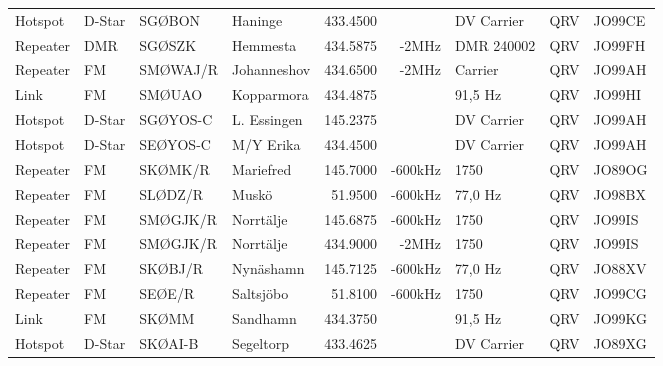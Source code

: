 \documentclass[10pt,swedish,a4paper,twoside]{article}
\begin{document}
\begin{landscape}
\begin{longtable}{llllrrlcl}
	Hotspot           & D-Star       & SGØBON        & Haninge      &          433.4500 &                & DV Carrier      &       QRV       & JO99CE           \\
	Repeater          & DMR          & SGØSZK        & Hemmesta     &          434.5875 &          -2MHz & DMR 240002      &       QRV       & JO99FH           \\
	Repeater          & FM           & SMØWAJ/R      & Johanneshov  &          434.6500 &          -2MHz & Carrier         &       QRV       & JO99AH           \\
	Link              & FM           & SMØUAO        & Kopparmora   &          434.4875 &                & 91,5 Hz         &       QRV       & JO99HI           \\
	Hotspot           & D-Star       & SGØYOS-C      & L. Essingen  &          145.2375 &                & DV Carrier      &       QRV       & JO99AH           \\
	Hotspot           & D-Star       & SEØYOS-C      & M/Y Erika    &          434.4500 &                & DV Carrier      &       QRV       & JO99AH           \\
	Repeater          & FM           & SKØMK/R       & Mariefred    &          145.7000 &        -600kHz & 1750           &       QRV       & JO89OG           \\
	Repeater          & FM           & SLØDZ/R       & Muskö        &           51.9500 &        -600kHz & 77,0 Hz          &       QRV       & JO98BX           \\
	Repeater          & FM           & SMØGJK/R      & Norrtälje    &          145.6875 &        -600kHz & 1750         &       QRV       & JO99IS           \\
	Repeater          & FM           & SMØGJK/R      & Norrtälje    &          434.9000 &          -2MHz & 1750         &       QRV       & JO99IS           \\
	Repeater          & FM           & SKØBJ/R       & Nynäshamn    &          145.7125 &        -600kHz & 77,0 Hz         &       QRV       & JO88XV           \\
	Repeater          & FM           & SEØE/R        & Saltsjöbo    &           51.8100 &        -600kHz & 1750         &       QRV       & JO99CG           \\
	Link              & FM           & SKØMM         & Sandhamn     &          434.3750 &                & 91,5 Hz         &       QRV       & JO99KG           \\
	Hotspot           & D-Star       & SKØAI-B       & Segeltorp    &          433.4625 &                & DV Carrier      &       QRV       & JO89XG           \\

\end{longtable}
\end{landscape}
\end{document}
